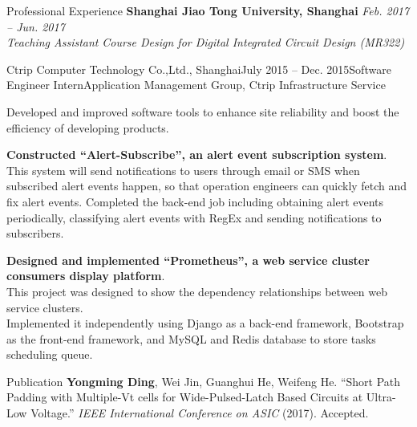 \documentclass{resume_ucla} %
\begin{document}
\begin{rSection}{Professional Experience}
\textbf{Shanghai Jiao Tong University, Shanghai} \hfill \emph{Feb. 2017 -- Jun. 2017}
\\\emph{Teaching Assistant} \hfill \emph {Course Design for Digital Integrated Circuit Design (MR322) }\\
\begin{rSubsection}{Ctrip Computer Technology Co.,Ltd., Shanghai}{July 2015 -- Dec. 2015}{Software Engineer Intern}{Application Management Group, Ctrip Infrastructure Service}
\item Developed and improved software tools to enhance site reliability and boost the efficiency of developing products.
\item \textbf{Constructed ``Alert-Subscribe'', an alert event subscription system}.  \\
This system will send notifications to users through email or SMS when subscribed alert events happen, so that operation engineers can quickly fetch and fix alert events. Completed the back-end job including obtaining alert events periodically, classifying alert events with RegEx and sending notifications to subscribers.
\item \textbf{Designed and implemented ``Prometheus'', a web service cluster consumers display platform}. \\
This project was designed to show the dependency relationships between web service clusters. \\
Implemented it independently using Django as a back-end framework, Bootstrap as the front-end framework, and MySQL and Redis database to store tasks scheduling queue.
\end{rSubsection}
\end{rSection}

\begin{rSection}{Publication}
\textbf{Yongming Ding}, Wei Jin, Guanghui He, Weifeng He. ``Short Path Padding with Multiple-Vt cells for Wide-Pulsed-Latch Based Circuits at Ultra-Low Voltage.'' \emph{IEEE International Conference on ASIC}  (2017). Accepted.
\end{rSection}
\end{document}

